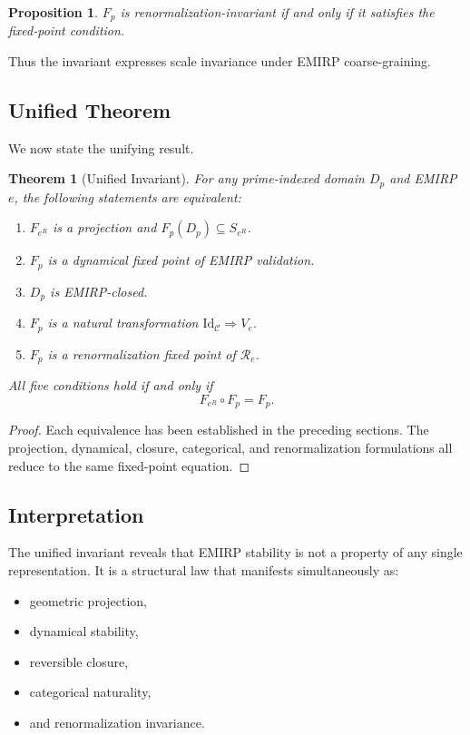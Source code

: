 \documentclass[11pt]{article}
\theoremstyle{definition}
\theoremstyle{plain}
\newtheorem{theorem}[definition]{Theorem}
\newtheorem{proposition}[definition]{Proposition}
\theoremstyle{remark}
\begin{document}
\begin{proposition}
$F_p$ is renormalization-invariant if and only if it satisfies the
fixed-point condition.
\end{proposition}

Thus the invariant expresses scale invariance under EMIRP
coarse-graining.

\subsection{Unified Theorem}

We now state the unifying result.

\begin{theorem}[Unified Invariant]
For any prime-indexed domain $D_p$ and EMIRP $e$, the following
statements are equivalent:
\begin{enumerate}
    \item $F_{e^R}$ is a projection and $F_p(D_p) \subseteq S_{e^R}$.
    \item $F_p$ is a dynamical fixed point of EMIRP validation.
    \item $D_p$ is EMIRP-closed.
    \item $F_p$ is a natural transformation $\mathrm{Id}_{\mathcal{C}} \Rightarrow V_e$.
    \item $F_p$ is a renormalization fixed point of $\mathcal{R}_e$.
\end{enumerate}
All five conditions hold if and only if
\[
F_{e^R} \circ F_p = F_p.
\]
\end{theorem}

\begin{proof}
Each equivalence has been established in the preceding sections. The
projection, dynamical, closure, categorical, and renormalization
formulations all reduce to the same fixed-point equation.
\end{proof}

\subsection{Interpretation}

The unified invariant reveals that EMIRP stability is not a property of
any single representation. It is a structural law that manifests
simultaneously as:

\begin{itemize}
    \item geometric projection,
    \item dynamical stability,
    \item reversible closure,
    \item categorical naturality,
    \item and renormalization invariance.
\end{itemize}
\end{document}
